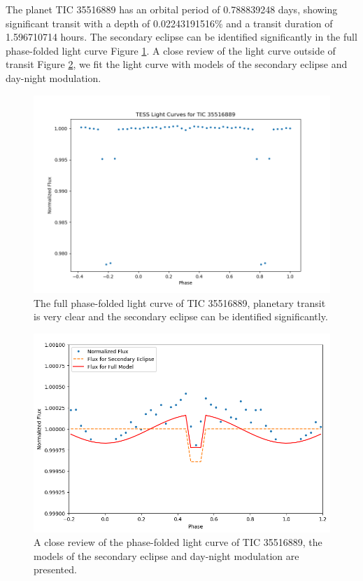 \documentclass{article}
\begin{document}
The planet TIC 35516889 has an orbital period of 0.788839248 days, showing significant transit with a depth of 0.02243191516\% and a transit duration of 1.596710714 hours. The secondary eclipse can be identified significantly in the full phase-folded light curve Figure \ref{fig:35516889_folded}. A close review of the light curve outside of transit Figure \ref{fig:35516889}, we fit the light curve with models of the secondary eclipse and day-night modulation.\begin{figure}[H]\centering\includegraphics[width=0.7\linewidth]{image/35516889_folded.png}\captionsetup{font=small} \caption{The full phase-folded light curve of TIC 35516889, planetary transit is very clear and the secondary eclipse can be identified significantly.}\label{fig:35516889_folded}\end{figure}\begin{figure}[H]\centering\includegraphics[width=0.65\linewidth]{image/35516889.png}\captionsetup{font=small} \caption{A close review of the phase-folded light curve of TIC 35516889, the models of the secondary eclipse and day-night modulation are presented.}\label{fig:35516889}\end{figure}
\newpage
\end{document}
